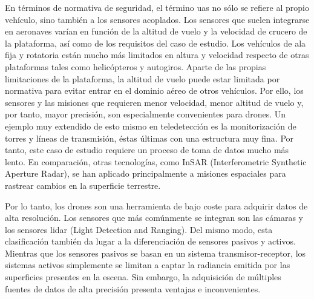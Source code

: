 En términos de normativa de seguridad, el término \acrshort{uas} no sólo se refiere al propio vehículo, sino también a los sensores acoplados. Los sensores que suelen integrarse en aeronaves varían en función de la altitud de vuelo y la velocidad de crucero de la plataforma, así como de los requisitos del caso de estudio. Los vehículos de ala fija y rotatoria están mucho más limitados en altura y velocidad respecto de otras plataformas tales como helicópteros y autogiros. Aparte de las propias limitaciones de la plataforma, la altitud de vuelo puede estar limitada por normativa para evitar entrar en el dominio aéreo de otros vehículos. Por ello, los sensores y las misiones que requieren menor velocidad, menor altitud de vuelo y, por tanto, mayor precisión, son especialmente convenientes para drones. Un ejemplo muy extendido de esto mismo en teledetección es la monitorización de torres y líneas de transmisión, éstas últimas con una estructura muy fina. Por tanto, este caso de estudio requiere un proceso de toma de datos mucho más lento. En comparación, otras tecnologías, como InSAR (Interferometric Synthetic Aperture Radar), se han aplicado principalmente a misiones espaciales para rastrear cambios en la superficie terrestre.

Por lo tanto, los drones son una herramienta de bajo coste para adquirir datos de alta resolución. Los sensores que más comúnmente se integran son las cámaras y los sensores \acrshort{lidar} (Light Detection and Ranging). Del mismo modo, esta clasificación también da lugar a la diferenciación de sensores pasivos y activos. Mientras que los sensores pasivos se basan en un sistema transmisor-receptor, los sistemas activos simplemente se limitan a captar la radiancia emitida por las superficies presentes en la escena. Sin embargo, la adquisición de múltiples fuentes de datos de alta precisión presenta ventajas e inconvenientes. 

